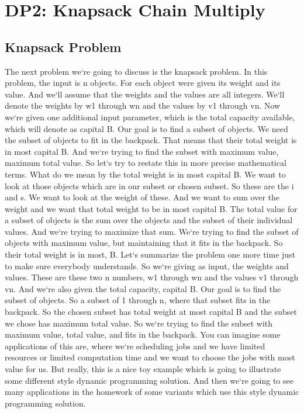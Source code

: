 \section{DP2: Knapsack    Chain Multiply}

\subsection{Knapsack Problem}
The next problem we`re going to discuss is the knapsack problem.
In this problem, the input is n objects.
For each object were given its weight and its value.
And we`ll assume that the weights and the values are all integers.
We`ll denote the weights by w1 through wn and the values by v1 through vn.
Now we`re given one additional input parameter, which is the total capacity available, which will denote as capital B\@.
Our goal is to find a subset of objects.
We need the subset of objects to fit in the backpack.
That means that their total weight is in most capital B\@.
And we`re trying to find the subset with maximum value, maximum total value.
So let`s try to restate this in more precise mathematical terms.
What do we mean by the total weight is in most capital B\@.
We want to look at those objects which are in our subset or chosen subset.
So these are the i and s.
We want to look at the weight of these.
And we want to sum over the weight and we want that total weight to be in most capital B\@.
The total value for a subset of objects is the sum over the objects and the subset of their individual values.
And we`re trying to maximize that sum.
We`re trying to find the subset of objects with maximum value, but maintaining that it fits in the backpack.
So their total weight is in most, B\@.
Let`s summarize the problem one more time just to make sure everybody understands.
So we`re giving as input, the weights and values.
These are these two n numbers, w1 through wn and the values v1 through vn.
And we`re also given the total capacity, capital B\@.
Our goal is to find the subset of objects.
So a subset of 1 through n, where that subset fits in the backpack.
So the chosen subset has total weight at most capital B and the subset we chose has maximum total value.
So we`re trying to find the subset with maximum value, total value, and fits in the backpack.
You can imagine some applications of this are, where we`re scheduling jobs and we have limited resources or limited computation time and we want to choose the jobs with most value for us.
But really, this is a nice toy example which is going to illustrate some different style dynamic programming solution.
And then we`re going to see many applications in the homework of some variants which use this style dynamic programming solution.

